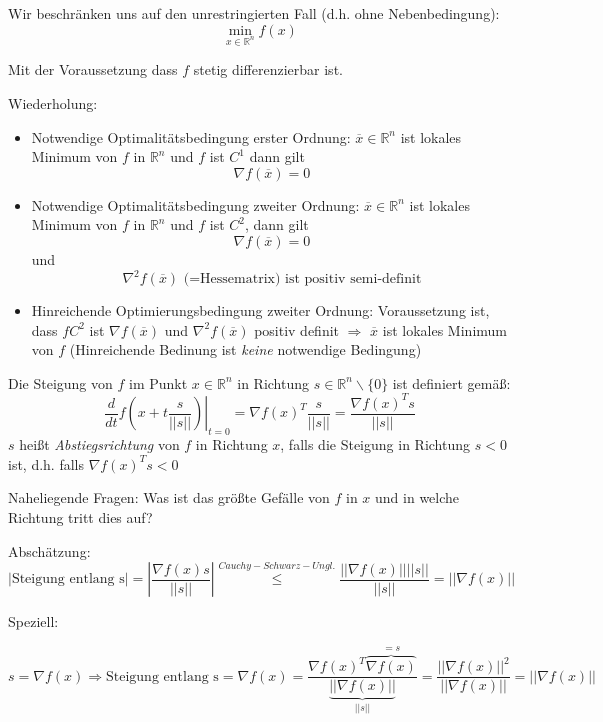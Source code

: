 \documentclass[10pt,a4paper]{article}
\begin{document}
Wir beschränken uns auf den unrestringierten Fall (d.h. ohne Nebenbedingung):
$$\min\limits_{x \in \mathbb{R}^{n}} f(x)$$

Mit der Voraussetzung dass $f$ stetig differenzierbar ist.

Wiederholung:

\begin{itemize}
\item Notwendige Optimalitätsbedingung erster Ordnung: $\overline{x} \in \mathbb{R}^{n}$ ist lokales Minimum von $f$ in $\mathbb{R}^{n}$ und $f $ ist $C^{1}$ dann gilt $$ \nabla f(\overline{x})=0$$ 
\item Notwendige Optimalitätsbedingung zweiter Ordnung: $\overline{x} \in \mathbb{R}^{n}$ ist lokales Minimum von $f$ in $\mathbb{R}^{n}$ und $f$ ist $C^{2}$, dann gilt $$\nabla f(\overline{x})=0$$ und $$\nabla^{2}f(\overline{x}) \text{ (=Hessematrix) ist positiv semi-definit}$$
\item Hinreichende Optimierungsbedingung zweiter Ordnung: Voraussetzung ist, dass $f C^{2}$ ist $\nabla f (\overline{x})$ und $\nabla^{2} f (\overline{x})$ positiv definit $\Rightarrow$ $\overline{x}$ ist lokales Minimum von $f$ (Hinreichende Bedinung ist \emph{keine} notwendige Bedingung)
\end{itemize}


\begin{defi}[Abstiegsrichtung]
Die Steigung von $f$ im Punkt $x \in \mathbb{R}^{n}$ in Richtung $s \in \mathbb{R}^{n} \backslash \{0\}$ ist definiert gemäß:
$$ \left. \frac{d}{dt} f(x+t \frac{s}{||s||}) \right|_{t=0} = \nabla f(x)^{T} \frac{s}{||s||} = \frac{\nabla f(x)^{T} s}{||s||}$$
$s$ heißt \emph{Abstiegsrichtung} von $f$ in Richtung $x$, falls die Steigung in Richtung $s<0$ ist, d.h. falls $\nabla f(x)^{T}s<0$
\end{defi}

Naheliegende Fragen:
Was ist das größte Gefälle von $f$ in $x$ und in welche Richtung tritt dies auf?

Abschätzung: $$|\text{Steigung entlang s}|= \left| \frac{\nabla f(x) s}{||s||} \right| \stackrel{Cauchy-Schwarz-Ungl.}{\leq} \frac{|| \nabla f(x)|| ||s||}{||s||} = ||\nabla f(x)||$$

Speziell:

$$s=\nabla f(x) \Rightarrow \text{Steigung entlang s} = \nabla f(x) = \frac{\nabla f(x)^{T} \overbrace{\nabla f(x)}^{=s} }{\underbrace{||\nabla f(x)||}_{||s||}} = \frac{||\nabla f(x)||^{2}}{||\nabla f(x)||}=||\nabla f(x)||$$
\end{document}
